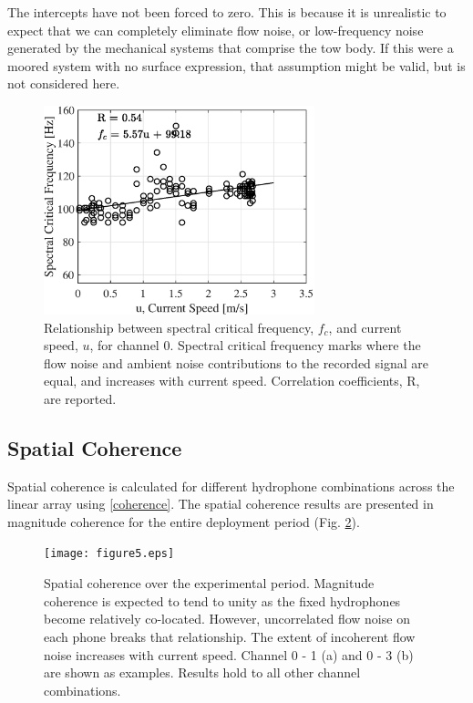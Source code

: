 \documentclass[12pt,journal,onecolumn]{IEEEtran}
\begin{document}
The intercepts have not been forced to zero. This is because it is unrealistic to expect that we can completely eliminate flow noise, or low-frequency noise generated by the mechanical systems that comprise the tow body. If this were a moored system with no surface expression, that assumption might be valid, but is not considered here. 
\begin{figure}[!t]
	\begin{center}
		\includegraphics[width=0.7\textwidth]{figure4.eps}
	\end{center}
	\caption[Spectral slope thresholding results]{
	\label{f:thresh}
	Relationship between spectral critical frequency, $f_c$, and current speed, $u$, for channel 0. Spectral critical frequency marks where the flow noise and ambient noise contributions to the recorded signal are equal, and increases with current speed. Correlation coefficients, R, are reported.}
\end{figure}




\subsection{Spatial Coherence}
Spatial coherence is calculated for different hydrophone combinations across the linear array using \eqref{coherence}. The spatial coherence results are presented in magnitude coherence for the entire deployment period (Fig. \ref{f:coherence}). 
\begin{figure}[!t]
	\begin{center}
		\texttt{[image: figure5.eps]}
	\end{center}
	\caption[Hydrophone spatial coherence]{
	\label{f:coherence}
	Spatial coherence over the experimental period. Magnitude coherence is expected to tend to unity as the fixed hydrophones become relatively co-located. However, uncorrelated flow noise on each phone breaks that relationship. The extent of incoherent flow noise increases with current speed. Channel 0 - 1 (a) and 0 - 3 (b) are shown as examples. Results hold to all other channel combinations.}
\end{figure}
\end{document}
